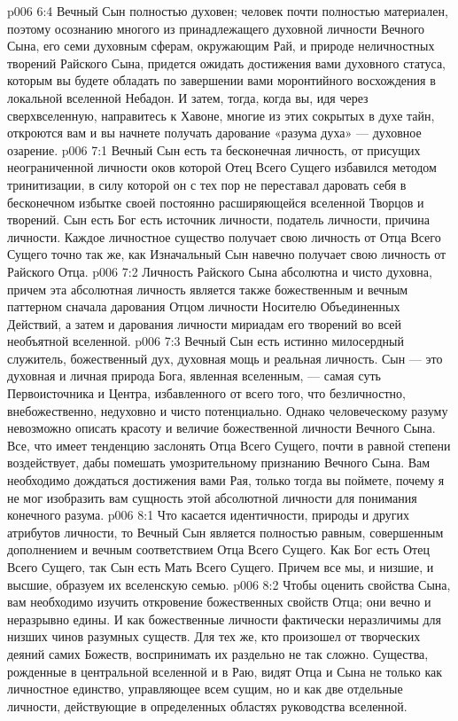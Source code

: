 \vs p006 6:4 Вечный Сын полностью духовен; человек почти полностью материален, поэтому осознанию многого из принадлежащего духовной личности Вечного Сына, его семи духовным сферам, окружающим Рай, и природе неличностных творений Райского Сына, придется ожидать достижения вами духовного статуса, которым вы будете обладать по завершении вами моронтийного восхождения в локальной вселенной Небадон. И затем, тогда, когда вы, идя через сверхвселенную, направитесь к Хавоне, многие из этих сокрытых в духе тайн, откроются вам и вы начнете получать дарование «разума духа» --- духовное озарение.
\vs p006 7:1 Вечный Сын есть та бесконечная личность, от присущих неограниченной личности оков которой Отец Всего Сущего избавился методом тринитизации, в силу которой он с тех пор не переставал даровать себя в бесконечном избытке своей постоянно расширяющейся вселенной Творцов и творений. Сын есть  Бог есть  источник личности, податель личности, причина личности. Каждое личностное существо получает свою личность от Отца Всего Сущего точно так же, как Изначальный Сын навечно получает свою личность от Райского Отца.
\vs p006 7:2 Личность Райского Сына абсолютна и чисто духовна, причем эта абсолютная личность является также божественным и вечным паттерном сначала дарования Отцом личности Носителю Объединенных Действий, а затем и дарования личности мириадам его творений во всей необъятной вселенной.
\vs p006 7:3 Вечный Сын есть истинно милосердный служитель, божественный дух, духовная мощь и реальная личность. Сын --- это духовная и личная природа Бога, явленная вселенным, --- самая суть Первоисточника и Центра, избавленного от всего того, что безличностно, внебожественно, недуховно и чисто потенциально. Однако человеческому разуму невозможно описать красоту и величие божественной личности Вечного Сына. Все, что имеет тенденцию заслонять Отца Всего Сущего, почти в равной степени воздействует, дабы помешать умозрительному признанию Вечного Сына. Вам необходимо дождаться достижения вами Рая, только тогда вы поймете, почему я не мог изобразить вам сущность этой абсолютной личности для понимания конечного разума.
\vs p006 8:1 Что касается идентичности, природы и других атрибутов личности, то Вечный Сын является полностью равным, совершенным дополнением и вечным соответствием Отца Всего Сущего. Как Бог есть Отец Всего Сущего, так Сын есть Мать Всего Сущего. Причем все мы, и низшие, и высшие, образуем их вселенскую семью.
\vs p006 8:2 Чтобы оценить свойства Сына, вам необходимо изучить откровение божественных свойств Отца; они вечно и неразрывно едины. И как божественные личности фактически неразличимы для низших чинов разумных существ. Для тех же, кто произошел от творческих деяний самих Божеств, воспринимать их раздельно не так сложно. Существа, рожденные в центральной вселенной и в Раю, видят Отца и Сына не только как личностное единство, управляющее всем сущим, но и как две отдельные личности, действующие в определенных областях руководства вселенной.
